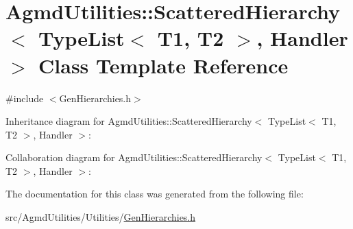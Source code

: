 \hypertarget{class_agmd_utilities_1_1_scattered_hierarchy_3_01_type_list_3_01_t1_00_01_t2_01_4_00_01_handler_01_4}{\section{Agmd\+Utilities\+:\+:Scattered\+Hierarchy$<$ Type\+List$<$ T1, T2 $>$, Handler $>$ Class Template Reference}
\label{class_agmd_utilities_1_1_scattered_hierarchy_3_01_type_list_3_01_t1_00_01_t2_01_4_00_01_handler_01_4}
}


{\ttfamily \#include $<$Gen\+Hierarchies.\+h$>$}



Inheritance diagram for Agmd\+Utilities\+:\+:Scattered\+Hierarchy$<$ Type\+List$<$ T1, T2 $>$, Handler $>$\+:


Collaboration diagram for Agmd\+Utilities\+:\+:Scattered\+Hierarchy$<$ Type\+List$<$ T1, T2 $>$, Handler $>$\+:


The documentation for this class was generated from the following file\+:\begin{DoxyCompactItemize}
\item 
src/\+Agmd\+Utilities/\+Utilities/\hyperlink{_gen_hierarchies_8h}{Gen\+Hierarchies.\+h}\end{DoxyCompactItemize}
